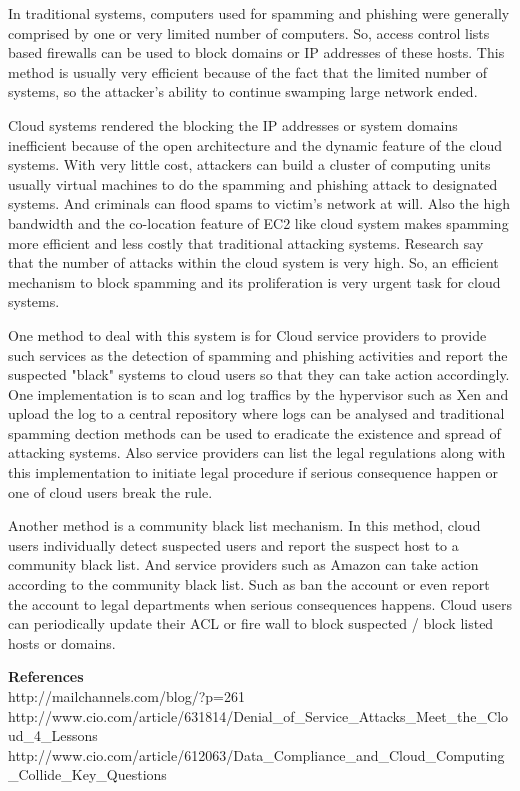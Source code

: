 \documentclass{article}
\begin{document}
\begin{enumerate}
In traditional systems, computers used for spamming and phishing were generally
comprised by one or very limited number of computers. So, access
control lists based firewalls can be used to block domains or IP
addresses of these hosts. This method is usually very efficient
because of the fact that the limited number of systems, so the
attacker's ability to continue swamping large network ended. 

Cloud systems rendered the blocking the IP addresses or system domains
inefficient because of the open architecture and the dynamic feature
of the cloud systems. With very little cost, attackers can build a
cluster of computing units usually virtual machines to do the spamming
and phishing attack to designated systems. And criminals can flood
spams to victim's network at will. Also the high bandwidth and the
co-location feature of EC2 like cloud system makes spamming more
efficient and less costly that traditional attacking systems. Research
say that the number of attacks within the cloud system is very
high. So, an efficient mechanism to block spamming and its
proliferation is very urgent task for cloud systems. 

One method to deal with this system is for Cloud service providers to
provide such services as the detection of spamming and phishing
activities and report the suspected "black" systems to cloud users so
that they can take action accordingly. One implementation is to scan
and log traffics by the hypervisor such as Xen and upload the log to
a central repository where logs can be analysed and traditional
spamming dection methods can be used to eradicate the existence and
spread of attacking systems. Also service providers can list the legal
regulations along with this implementation to initiate legal procedure
if serious consequence happen or one of cloud users break the rule. 

Another method is a community black list mechanism. In this method,
cloud users individually detect suspected users and report the suspect
host to a community black list. And service providers such as Amazon
can take action according to the community black list. Such as ban the
account or even report the account to legal departments when serious
consequences happens. Cloud users can periodically update their ACL or
fire wall to block suspected / block listed hosts or domains.

\textbf{References} \\ 
http://mailchannels.com/blog/?p=261 \\
http://www.cio.com/article/631814/Denial\_of\_Service\_Attacks\_Meet\_the\_Cloud\_4\_Lessons \\
http://www.cio.com/article/612063/Data\_Compliance\_and\_Cloud\_Computing\_Collide\_Key\_Questions



\end{enumerate}
\end{document}
